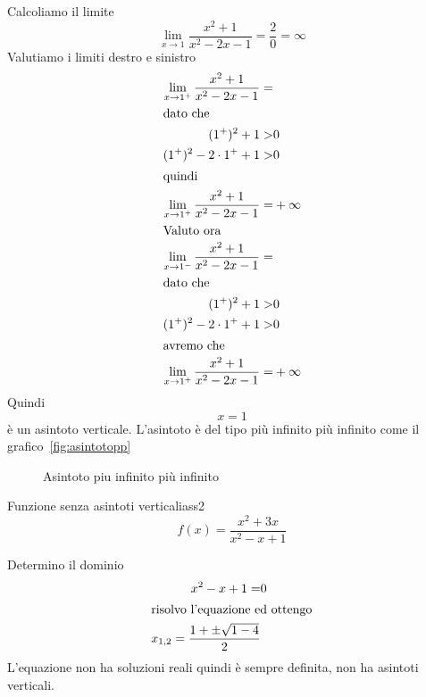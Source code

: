 Calcoliamo il limite\[\lim_{x\to 1}\dfrac{x^2+1}{x^2-2x-1}=\dfrac{2}{0}=\infty\]
Valutiamo i limiti destro e sinistro
\begin{align*}
\lim_{x\to 1^+}\dfrac{x^2+1}{x^2-2x-1}=&\\
\intertext{dato che}
(1^+)^2+1>&0\\
(1^+)^2 -2\cdot 1^+ +1>&0\\
\intertext{quindi}
\lim_{x\to 1^+}\dfrac{x^2+1}{x^2-2x-1}=&+\infty\\
\intertext{Valuto ora}
\lim_{x\to 1^-}\dfrac{x^2+1}{x^2-2x-1}=&\\
\intertext{dato che}
(1^+)^2+1>&0\\
(1^+)^2 -2\cdot 1^+ +1>&0\\
\intertext{avremo che}
\lim_{x\to 1^+}\dfrac{x^2+1}{x^2-2x-1}=&+\infty\\
\end{align*}
Quindi \[x=1\] è un asintoto verticale.
L'asintoto è del tipo più infinito più infinito come il grafico~\vref{fig:asintotopp}
\begin{figure}
	\centering
	
	\captionsetup{format=grafico}
	\caption[Asintoto più infinito più infinito]{Asintoto piu infinito più infinito}
	\label{fig:asintotopp}
\end{figure}
\begin{cesempiot}{Funzione senza asintoti verticali}{ass2}
	\[f(x)=\dfrac{x^2+3x}{x^2-x+1} \]
\end{cesempiot}
Determino il dominio
\begin{align*}
x^2-x+1=&0\\
\intertext{risolvo l'equazione ed ottengo}
x_{1,2}=\dfrac{1+\pm\sqrt{1-4}}{2}
\end{align*}
L'equazione non ha soluzioni  reali quindi è sempre definita, non ha asintoti verticali.
